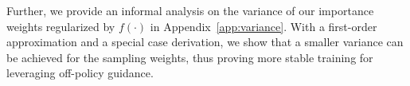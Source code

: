 \documentclass{article}
\newtheorem{theorem}{Theorem}
\newcommand{\var}{\mathbb{V}\text{ar}}
\begin{document}
Further, we provide an informal analysis on the variance of our importance weights regularized by $f(\cdot)$ in Appendix~\ref{app:variance}.
With a first-order approximation and a special case derivation, we show that a smaller variance can be achieved for the sampling weights, thus proving more stable training for leveraging off-policy guidance.














\end{document}
